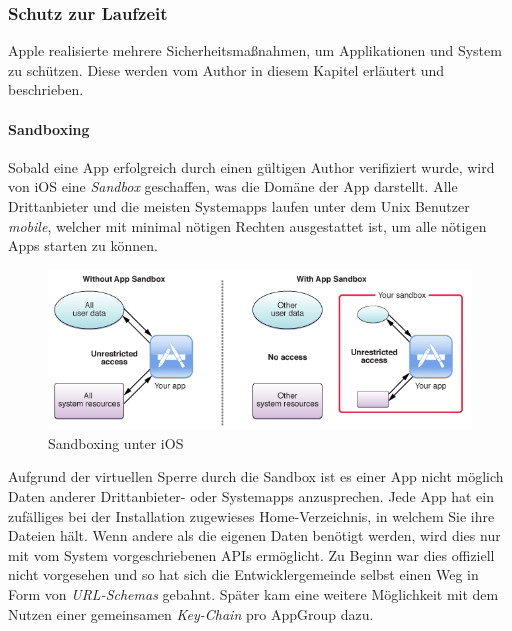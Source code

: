 	\subsubsection{Schutz zur Laufzeit}
		Apple realisierte mehrere Sicherheitsmaßnahmen, um Applikationen und System zu
		schützen. Diese werden vom Author in diesem Kapitel erläutert und 
		beschrieben.
		
		\paragraph{Sandboxing}\label{sec:sandboxing}
			Sobald eine App erfolgreich durch einen gültigen Author verifiziert wurde,
			wird von iOS eine \textsl{Sandbox} geschaffen, was die Domäne der App
			darstellt. Alle Drittanbieter und die meisten Systemapps laufen unter dem
			Unix Benutzer \textsl{mobile}, welcher mit minimal nötigen Rechten
			ausgestattet ist, um alle nötigen Apps starten zu können.
			\begin{figure}[h]
				\centering
				\includegraphics[width=0.9\linewidth]{ios/media/sandboxing.png}
				\caption{Sandboxing unter iOS 
				\cite{IOSSandboxing}}
				\label{fig:sandboxing}
			\end{figure}
			Aufgrund der virtuellen Sperre durch die Sandbox ist es einer App nicht
			möglich Daten anderer Drittanbieter- oder Systemapps anzusprechen. Jede App
			hat ein zufälliges bei der Installation zugewieses Home-Verzeichnis, in
			welchem Sie ihre Dateien hält. Wenn andere als die eigenen Daten benötigt
			werden, wird dies nur mit vom System vorgeschriebenen APIs ermöglicht. Zu
			Beginn war dies offiziell nicht vorgesehen und so hat sich die
			Entwicklergemeinde selbst einen Weg in Form von \textsl{URL-Schemas}
			gebahnt. Später kam eine weitere Möglichkeit mit dem Nutzen einer
			gemeinsamen \textsl{Key-Chain} pro AppGroup dazu\cite[S.83]{Banks2015}.
				
